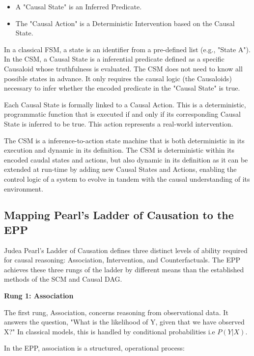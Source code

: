 \begin{itemize}
	\item A "Causal State" is an Inferred Predicate. 
	\item The "Causal Action" is a Deterministic Intervention based on the  Causal State.
\end{itemize}

In a classical FSM, a state is an identifier from a pre-defined list (e.g., "State A").
In the CSM, a Causal State is a inferential predicate defined as a specific Causaloid whose truthfulness is evaluated. The CSM does not need to know all possible states in advance. It only requires the causal logic (the Causaloids) necessary to infer whether the encoded predicate in the "Causal State" is true. 

Each Causal State is formally linked to a Causal Action. This is a deterministic, programmatic function that is executed if and only if its corresponding Causal State is inferred to be true. This action represents a real-world intervention.

The CSM is a inference-to-action state machine that is both deterministic in its execution and dynamic in its definition. The CSM is deterministic within its encoded caudal states and actions, but also dynamic in its definition as it can be extended at run-time by adding new Causal States and Actions, enabling the control logic of a system to evolve in tandem with the causal understanding of its environment. 

\newpage

\subsection{Mapping Pearl's Ladder of Causation to the EPP}
\label{sec:epp_ladder_causation}

Judea Pearl's Ladder of Causation\cite{pearl2000causality} defines three distinct levels of ability required for causal reasoning: Association, Intervention, and Counterfactuals. The EPP achieves these three rungs of the ladder by different means than the established methods of the SCM and Causal DAG.  

\textbf{Rung 1: Association}

The first rung, Association, concerns reasoning from observational data. 
It answers the question, "What is the likelihood of Y, given that we have observed X?" In classical models, this is handled by conditional probabilities i.e $P(Y|X)$.

In the EPP, association is a structured, operational process:

